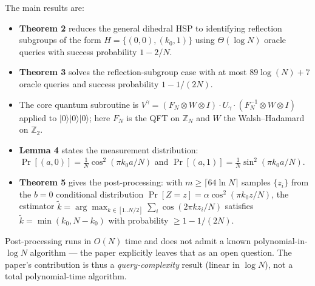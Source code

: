 \documentclass[11pt]{article}
\begin{document}
The main results are:
\begin{itemize}
  \item \textbf{Theorem 2} reduces the general dihedral HSP to identifying
        reflection subgroups of the form $H = \{(0,0),(k_0,1)\}$ using
        $\Theta(\log N)$ oracle queries with success probability $1 - 2/N$.
  \item \textbf{Theorem 3} solves the reflection-subgroup case with at most
        $89 \log(N)+7$ oracle queries and success probability
        $1 - 1/(2N)$.
  \item The core quantum subroutine is $V^\gamma = (F_N \otimes W \otimes I)
        \cdot U_\gamma \cdot (F_N^{-1} \otimes W \otimes I)$ applied to
        $|0\rangle|0\rangle|0\rangle$; here $F_N$ is the QFT on
        $\mathbb{Z}_N$ and $W$ the Walsh--Hadamard on $\mathbb{Z}_2$.
  \item \textbf{Lemma 4} states the measurement distribution:
        $\Pr[(a,0)] = \tfrac{1}{N}\cos^2(\pi k_0 a / N)$ and
        $\Pr[(a,1)] = \tfrac{1}{N}\sin^2(\pi k_0 a / N)$.
  \item \textbf{Theorem 5} gives the post-processing: with
        $m \geq \lceil 64\ln N\rceil$ samples $\{z_i\}$ from
        the $b{=}0$ conditional distribution
        $\Pr[Z{=}z] = \alpha \cos^2(\pi k_0 z / N)$, the estimator
        $\tilde k = \arg\max_{k\in[1..N/2]} \sum_i \cos(2\pi k z_i / N)$
        satisfies $\tilde k = \min(k_0, N-k_0)$ with probability $\geq 1 - 1/(2N)$.
\end{itemize}
Post-processing runs in $O(N)$ time and does not admit a known
polynomial-in-$\log N$ algorithm --- the paper explicitly leaves that as an
open question. The paper's contribution is thus a \emph{query-complexity} result
(linear in $\log N$), not a total polynomial-time algorithm.
\end{document}
